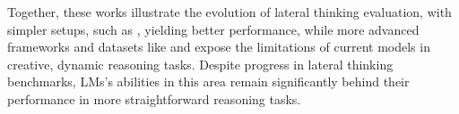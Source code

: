 Together, these works illustrate the evolution of lateral thinking evaluation, with simpler setups, such as \textcite{jiangBRAINTEASERLateralThinking2023}, yielding better performance, while more advanced frameworks and datasets like \textcite{huangLatEvalInteractiveLLMs2024} and \textcite{chenWeakevalStrongEvaluatingEliciting2024} expose the limitations of current models in creative, dynamic reasoning tasks. Despite progress in lateral thinking benchmarks, \acp{LM}'s abilities in this area remain significantly behind their performance in more straightforward reasoning tasks.
